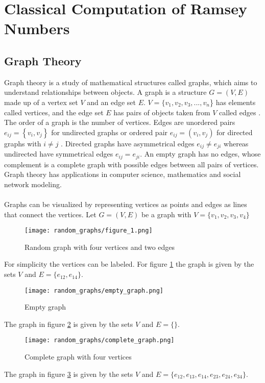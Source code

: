 \documentclass{Assignment}
\begin{document}
\section{Classical Computation of Ramsey Numbers}
\subsection{Graph Theory}
Graph theory is a study of mathematical structures called graphs, which aims to understand relationships between objects. 
A graph is a structure $G =\left(V,E\right)$ made up of a vertex set $V$ and an edge set $E$.
$V = \{v_1,v_2,v_3,...,v_n$\} has elements called vertices, and the edge set $E$ has pairs of objects taken from $V$ called edges \cite{BondyMurty2008}.
The order of a graph is the number of vertices.
Edges are unordered pairs $e_{ij} = \left\{v_i,v_j\right\}$ for undirected graphs or ordered pair $e_{ij} = (v_i,v_j)$ for directed graphs with $i\neq j$  \cite{BondyMurty2008}.
Directed graphs have asymmetrical edges $e_{ij} \neq e_{ji}$ whereas undirected have symmetrical edges $e_{ij} = e_{ji}$.
An empty graph has no edges, whose complement is a complete graph with possible edges between all pairs of vertices.
Graph theory has applications in computer science, mathematics and social network modeling.
\\\\
Graphs can be visualized by representing vertices as points and edges as lines that connect the vertices.
Let $G = (V,E)$ be a graph with $V = \{v_1, v_2, v_3, v_4\}$
\begin{figure}[H]
	\centering
	\texttt{[image: random\_graphs/figure\_1.png]}
	\caption{Random graph with four vertices and two edges}
	\label{random_graph}
\end{figure}
For simplicity the vertices can be labeled.
For figure \ref{random_graph} the graph is given by the sets  $V $ and $E=\{e_{12},e_{14}\}.$
\begin{figure}[H]
	\centering
	\texttt{[image: random\_graphs/empty\_graph.png]}
	\caption{Empty graph}
	\label{empty_graph}
\end{figure}
The graph in figure \ref{empty_graph} is given by the sets $V$ and $E=\{\}.$
\begin{figure}[H]
	\centering
	\texttt{[image: random\_graphs/complete\_graph.png]}
	\caption{Complete graph with four vertices }
	\label{complete_graph}
\end{figure}
The graph in figure \ref{complete_graph} is given by the sets  $V $ and $E=\{e_{12},e_{13},e_{14},e_{23},e_{24},e_{34}\}.$ 
\end{document}
